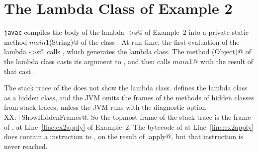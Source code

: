 \section{The Lambda Class of Example 2}
\label{app:lambda}
\texttt{javac} compiles the body of the lambda \Q@s->s@ of Example~2 into a private static method \Q@lambda$main$1(String)@ of the class \Q@Broken@.
At run time, the first evaluation of the lambda \Q@s->s@ calls \Q@LambdaMetafactory@, which generates the lambda class.
The method \Q@apply(Object)@ of the lambda class casts its argument to \Q@String@, and then calls \Q@lambda$main$1@ with the result of that cast.

The stack trace of the \Q@ClassCastException@ does not show the lambda class.
\Q@LambdaMetafactory@ defines the lambda class as a hidden class, and the JVM omits the frames of the methods of hidden classes from stack traces, unless the JVM runs with the diagnostic option \Q@-XX:+ShowHiddenFrames@.
So the topmost frame of the stack trace is the frame of \Q@m@, at Line~\ref{line:ex2apply} of Example~2.
The bytecode of \Q@m@ at Line~\ref{line:ex2apply} does contain a \Q@checkcast@ instruction to \Q@String@, on the result of \Q@f.apply@, but that instruction is never reached.
